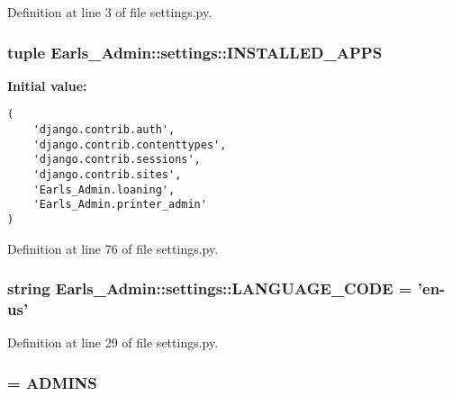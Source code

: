 Definition at line 3 of file settings.py.\hypertarget{namespaceEarls__Admin_1_1settings_192238fe7cae5ce1c358531630d09992}{
\subsubsection[INSTALLED\_\-APPS]{\setlength{\rightskip}{0pt plus 5cm}tuple {\bf Earls\_\-Admin::settings::INSTALLED\_\-APPS}}}
\label{namespaceEarls__Admin_1_1settings_192238fe7cae5ce1c358531630d09992}


\textbf{Initial value:}

\begin{Code}\begin{verbatim}(
    'django.contrib.auth',
    'django.contrib.contenttypes',
    'django.contrib.sessions',
    'django.contrib.sites',
    'Earls_Admin.loaning',
    'Earls_Admin.printer_admin'
)
\end{verbatim}
\end{Code}


Definition at line 76 of file settings.py.\hypertarget{namespaceEarls__Admin_1_1settings_b9abde9d8ff66ce6e93a11316b5bc5fb}{
\subsubsection[LANGUAGE\_\-CODE]{\setlength{\rightskip}{0pt plus 5cm}string {\bf Earls\_\-Admin::settings::LANGUAGE\_\-CODE} = 'en-us'}}
\label{namespaceEarls__Admin_1_1settings_b9abde9d8ff66ce6e93a11316b5bc5fb}




Definition at line 29 of file settings.py.\hypertarget{namespaceEarls__Admin_1_1settings_d8e4d0a51872b844355f6abbc0b4955b}{
\subsubsection[MANAGERS]{ = {\bf ADMINS}}}
\label{namespaceEarls__Admin_1_1settings_d8e4d0a51872b844355f6abbc0b4955b}




